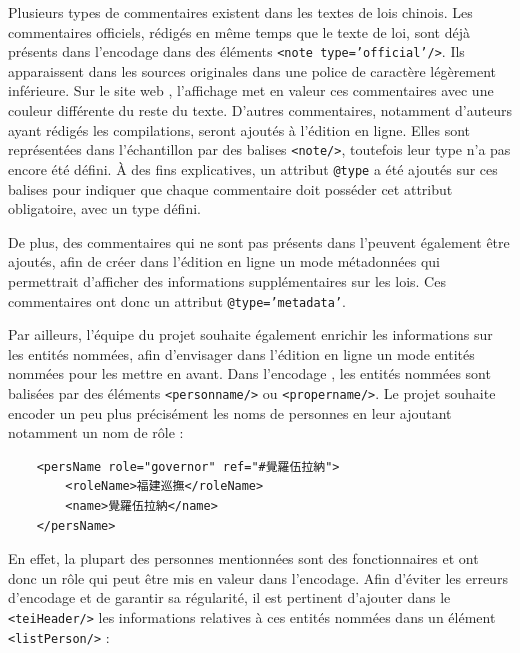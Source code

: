Plusieurs types de commentaires existent dans les textes de lois chinois. Les commentaires officiels, rédigés en même temps que le texte de loi, sont déjà présents dans l'encodage dans des éléments \texttt{<note type='official'/>}. Ils apparaissent dans les sources originales dans une police de caractère légèrement inférieure. Sur le site web \LSC, l'affichage met en valeur ces commentaires avec une couleur différente du reste du texte. D'autres commentaires, notamment d'auteurs ayant rédigés les compilations, seront ajoutés à l'édition en ligne. Elles sont représentées dans l'échantillon par des balises \texttt{<note/>}, toutefois leur type n'a pas encore été défini. À des fins explicatives, un attribut \texttt{@type} a été ajoutés sur ces balises pour indiquer que chaque commentaire doit posséder cet attribut obligatoire, avec un type défini.

De plus, des commentaires qui ne sont pas présents dans l'\OCR peuvent également être ajoutés, afin de créer dans l'édition en ligne un mode \og métadonnées \fg qui permettrait d'afficher des informations supplémentaires sur les lois. Ces commentaires ont donc un attribut \texttt{@type='metadata'}. 

Par ailleurs, l'équipe du projet souhaite également enrichir les informations sur les entités nommées, afin d'envisager dans l'édition en ligne un mode \og entités nommées \fg pour les mettre en avant. Dans l'encodage \LSC, les entités nommées sont balisées par des éléments \texttt{<personname/>} ou \texttt{<propername/>}. Le projet \COREL souhaite encoder un peu plus précisément les noms de personnes en leur ajoutant notamment un nom de rôle : 

\begin{verbatim}
    <persName role="governor" ref="#覺羅伍拉納">
        <roleName>福建巡撫</roleName>
        <name>覺羅伍拉納</name>
    </persName>
\end{verbatim}
En effet, la plupart des personnes mentionnées sont des fonctionnaires et ont donc un rôle qui peut être mis en valeur dans l'encodage. Afin d'éviter les erreurs d'encodage et de garantir sa régularité, il est pertinent d'ajouter dans le \texttt{<teiHeader/>} les informations relatives à ces entités nommées dans un élément \texttt{<listPerson/>} : 

